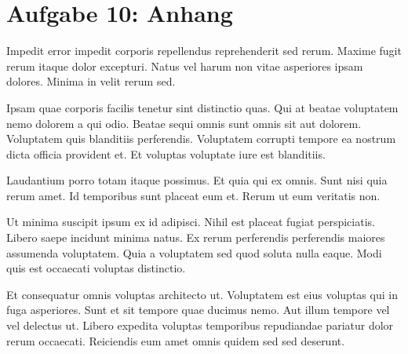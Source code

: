 \newpage
\section{Aufgabe 10: Anhang}

Impedit error impedit corporis repellendus reprehenderit sed rerum. Maxime fugit rerum itaque dolor excepturi. Natus vel harum non vitae asperiores ipsam dolores. Minima in velit rerum sed.

Ipsam quae corporis facilis tenetur sint distinctio quas. Qui at beatae voluptatem nemo dolorem a qui odio. Beatae sequi omnis sunt omnis sit aut dolorem. Voluptatem quis blanditiis perferendis. Voluptatem corrupti tempore ea nostrum dicta officia provident et. Et voluptas voluptate iure est blanditiis.

Laudantium porro totam itaque possimus. Et quia qui ex omnis. Sunt nisi quia rerum amet. Id temporibus sunt placeat eum et. Rerum ut eum veritatis non.

Ut minima suscipit ipsum ex id adipisci. Nihil est placeat fugiat perspiciatis. Libero saepe incidunt minima natus. Ex rerum perferendis perferendis maiores assumenda voluptatem. Quia a voluptatem sed quod soluta nulla eaque. Modi quis est occaecati voluptas distinctio.

Et consequatur omnis voluptas architecto ut. Voluptatem est eius voluptas qui in fuga asperiores. Sunt et sit tempore quae ducimus nemo. Aut illum tempore vel vel delectus ut. Libero expedita voluptas temporibus repudiandae pariatur dolor rerum occaecati. Reiciendis eum amet omnis quidem sed sed deserunt.
